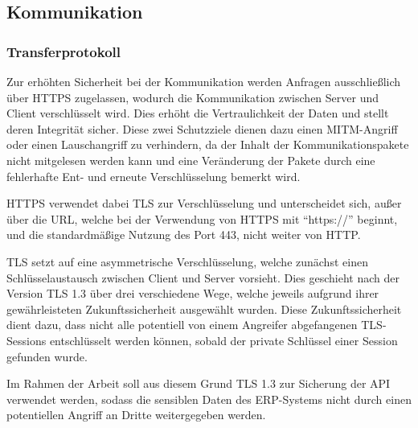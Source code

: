 \subsection{Kommunikation}


\subsubsection{Transferprotokoll}\label{chapter:https}

Zur erhöhten Sicherheit bei der Kommunikation werden Anfragen ausschließlich über \ac{HTTPS} zugelassen, wodurch die Kommunikation zwischen Server und Client verschlüsselt wird.
Dies erhöht die Vertraulichkeit der Daten und stellt deren Integrität sicher.
Diese zwei Schutzziele dienen dazu einen \ac*{MITM}-Angriff oder einen Lauschangriff zu verhindern, da der Inhalt der Kommunikationspakete nicht mitgelesen werden kann und eine Veränderung der Pakete durch eine fehlerhafte Ent- und erneute Verschlüsselung bemerkt wird.

\ac{HTTPS} verwendet dabei \ac{TLS} zur Verschlüsselung und unterscheidet sich, außer über die \ac{URL}, welche bei der Verwendung von \ac{HTTPS} mit \enquote{https://} beginnt, und die standardmäßige Nutzung des Port 443, nicht weiter von \ac{HTTP}.

\ac{TLS} setzt auf eine asymmetrische Verschlüsselung, welche zunächst einen Schlüsselaustausch zwischen Client und Server vorsieht.
Dies geschieht nach der Version \ac{TLS} 1.3 über drei verschiedene Wege, welche jeweils aufgrund ihrer gewährleisteten Zukunftssicherheit ausgewählt wurden.
Diese Zukunftssicherheit dient dazu, dass nicht alle potentiell von einem Angreifer abgefangenen \ac{TLS}-Sessions entschlüsselt werden können, sobald der private Schlüssel einer Session gefunden wurde.

Im Rahmen der Arbeit soll aus diesem Grund \ac{TLS} 1.3 zur Sicherung der \ac{API} verwendet werden, sodass die sensiblen Daten des \ac{ERP}-Systems nicht durch einen potentiellen Angriff an Dritte weitergegeben werden.\autocite{rf-RFC8446}
